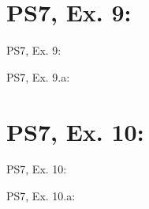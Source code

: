 \section{PS7, Ex. 9: }

\begin{frame}{PS7, Ex. 9: }
  \begin{multicols}{2}
    \vfill\null\columnbreak
    \vfill
  \end{multicols}
\end{frame}

\begin{frame}{PS7, Ex. 9.a: }
  \begin{multicols}{2}
    \vfill\null\columnbreak
    \vfill\null
  \end{multicols}
\end{frame}



\section{PS7, Ex. 10: }

\begin{frame}{PS7, Ex. 10: }
  \begin{multicols}{2}
    \vfill\null\columnbreak
    \vfill\null
  \end{multicols}
\end{frame}

\begin{frame}{PS7, Ex. 10.a: }
  \begin{multicols}{2}
    \vfill\null\columnbreak
    \vfill\null
  \end{multicols}
\end{frame}
